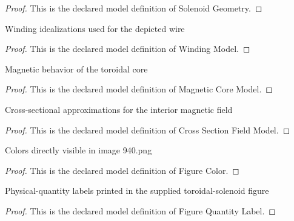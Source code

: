 \begin{proof}
  This is the declared model definition of Solenoid Geometry.
\end{proof}
\begin{definition}
  \label{def:physics:phyx-mini-0940:phyxminiproblems-problemphyxmini0940-windingmodel}
  Winding idealizations used for the depicted wire
\end{definition}
\begin{proof}
  This is the declared model definition of Winding Model.
\end{proof}
\begin{definition}
  \label{def:physics:phyx-mini-0940:phyxminiproblems-problemphyxmini0940-magneticcoremodel}
  Magnetic behavior of the toroidal core
\end{definition}
\begin{proof}
  This is the declared model definition of Magnetic Core Model.
\end{proof}
\begin{definition}
  \label{def:physics:phyx-mini-0940:phyxminiproblems-problemphyxmini0940-crosssectionfieldmodel}
  Cross-sectional approximations for the interior magnetic field
\end{definition}
\begin{proof}
  This is the declared model definition of Cross Section Field Model.
\end{proof}
\begin{definition}
  \label{def:physics:phyx-mini-0940:phyxminiproblems-problemphyxmini0940-figurecolor}
  Colors directly visible in image 940.png
\end{definition}
\begin{proof}
  This is the declared model definition of Figure Color.
\end{proof}
\begin{definition}
  \label{def:physics:phyx-mini-0940:phyxminiproblems-problemphyxmini0940-figurequantitylabel}
  Physical-quantity labels printed in the supplied toroidal-solenoid figure
\end{definition}
\begin{proof}
  This is the declared model definition of Figure Quantity Label.
\end{proof}
